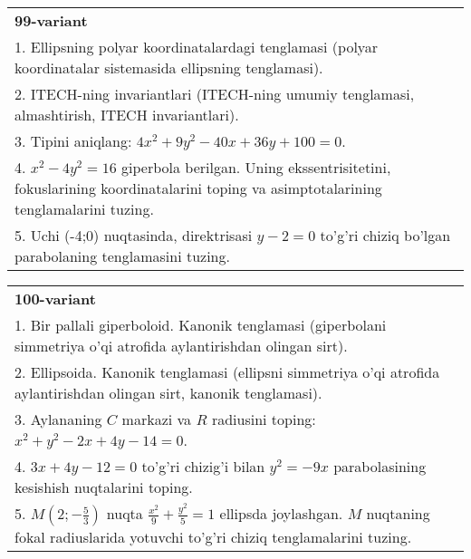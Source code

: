 \documentclass{article}
\begin{document}
\begin{tabular}{m{17cm}}
\textbf{99-variant}\\
1. Ellipsning polyar koordinatalardagi tenglamasi (polyar koordinatalar sistemasida ellipsning tenglamasi).\\

2. ITECH-ning invariantlari (ITECH-ning umumiy tenglamasi, almashtirish, ITECH invariantlari).\\

3. Tipini aniqlang: $4x^2+9y^2-40x+36y+100=0$.\\

4. $x^{2} - 4y^{2} = 16$ giperbola berilgan. Uning ekssentrisitetini, fokuslarining koordinatalarini toping va asimptotalarining tenglamalarini tuzing.\\

5. Uchi (-4;0) nuqtasinda, direktrisasi $y - 2 = 0$ to'g'ri chiziq bo'lgan parabolaning tenglamasini tuzing.
\end{tabular}
\vspace{1cm}


\begin{tabular}{m{17cm}}
\textbf{100-variant}\\
1. Bir pallali giperboloid. Kanonik tenglamasi (giperbolani simmetriya o'qi atrofida aylantirishdan olingan sirt).\\

2. Ellipsoida. Kanonik tenglamasi (ellipsni simmetriya o'qi atrofida aylantirishdan olingan sirt, kanonik tenglamasi).\\

3. Aylananing $C$ markazi va $R$ radiusini toping: $x^2+y^2-2x+4y-14=0$.\\

4. $3x + 4y - 12 = 0$ to'g'ri chizig'i bilan $y^{2} = - 9x$ parabolasining kesishish nuqtalarini toping.  \\

5. $M(2; - \frac{5}{3})$ nuqta $\frac{x^{2}}{9} + \frac{y^{2}}{5} = 1$ ellipsda joylashgan. $M$ nuqtaning fokal radiuslarida yotuvchi to'g'ri chiziq tenglamalarini tuzing.  
\end{tabular}
\vspace{1cm}
\end{document}
